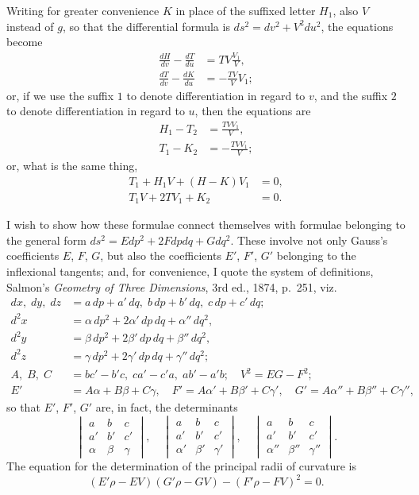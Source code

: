 \documentclass[11pt,a4paper]{book}
\begin{document}
Writing for greater convenience $K$ in place of the suffixed letter $H_1$, also $V$ instead of $g$, so that the differential formula is $ds^2 = dv^2 + V^2 du^2$, the equations become
\[
\begin{aligned}
\frac{dH}{dv} - \frac{dT}{du} &= TV \frac{V_1}{V},\\
\frac{dT}{dv} - \frac{dK}{du} &= -\frac{TV}{V} V_1;
\end{aligned}
\]
or, if we use the suffix $1$ to denote differentiation in regard to $v$, and the suffix $2$ to denote differentiation in regard to $u$, then the equations are
\[
\begin{aligned}
H_1 - T_2 &= \frac{TV V_1}{V},\\
T_1 - K_2 &= -\frac{TV V_1}{V};
\end{aligned}
\]
or, what is the same thing,
\[
\begin{aligned}
T_1 + H_1 V + (H - K)V_1 &= 0,\\
T_1 V + 2TV_1 + K_2 &= 0.
\end{aligned}
\]

I wish to show how these formulae connect themselves with formulae belonging to the general form $ds^2 = Edp^2 + 2Fdpdq + Gdq^2$. These involve not only Gauss's coefficients $E$, $F$, $G$, but also the coefficients $E'$, $F'$, $G'$ belonging to the inflexional tangents; and, for convenience, I quote the system of definitions, Salmon's \textit{Geometry of Three Dimensions}, 3rd ed., 1874, p.~251, viz.
\[
\begin{aligned}
dx,\; dy,\; dz &= a\,dp + a'\,dq,\; b\,dp + b'\,dq,\; c\,dp + c'\,dq;\\
d^2x &= \alpha\,dp^2 + 2\alpha'\,dp\,dq + \alpha''\,dq^2,\\
d^2y &= \beta\,dp^2 + 2\beta'\,dp\,dq + \beta''\,dq^2,\\
d^2z &= \gamma\,dp^2 + 2\gamma'\,dp\,dq + \gamma''\,dq^2;\\
A,\; B,\; C &= bc' - b'c,\; ca' - c'a,\; ab' - a'b;\quad V^2 = EG - F^2;\\
E' &= A\alpha + B\beta + C\gamma,\quad F' = A\alpha' + B\beta' + C\gamma',\quad G' = A\alpha'' + B\beta'' + C\gamma'',
\end{aligned}
\]
so that $E'$, $F'$, $G'$ are, in fact, the determinants
\[
\begin{vmatrix}
a & b & c \\
a' & b' & c' \\
\alpha & \beta & \gamma
\end{vmatrix},\quad
\begin{vmatrix}
a & b & c \\
a' & b' & c' \\
\alpha' & \beta' & \gamma'
\end{vmatrix},\quad
\begin{vmatrix}
a & b & c \\
a' & b' & c' \\
\alpha'' & \beta'' & \gamma''
\end{vmatrix}.
\]
The equation for the determination of the principal radii of curvature is
\[
(E'\rho - EV)(G'\rho - GV) - (F'\rho - FV)^2 = 0.
\]
\end{document}
